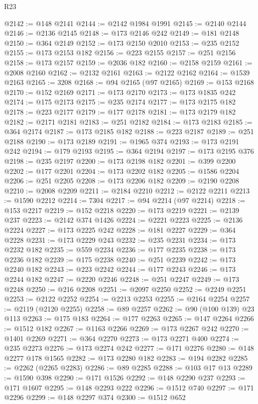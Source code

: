 \begin{lexlean}{R23}
\begin{coremodule}
@2142 := @148 @2141
@2144 := @2142 @1984 @1991
@2145 := @2140 @2144
@2146 := @2136 @2145
@2148 := @173 @2146 @242
@2149 := @181 @2148
@2150 := @364 @2149
@2152 := @173 @2150 @2010
@2153 := @235 @2152
@2155 := @173 @2153 @182
@2156 := @223 @2155
@2157 := @251 @2156
@2158 := @173 @2157
@2159 := @2036 @182
@2160 := @2158 @2159
@2161 := @2008 @2160
@2162 := @2132 @2161
@2163 := @2122 @2162
@2164 := @1539 @2163
@2165 := 3208
@2168 := @94 @2165 (@97 @2165)
@2169 := @153 @2168
@2170 := @152 @2169
@2171 := @173 @2170
@2173 := @173 @1835 @242
@2174 := @175 @2173
@2175 := @235 @2174
@2177 := @173 @2175 @182
@2178 := @223 @2177
@2179 := @177 @2178
@2181 := @173 @2179 @182
@2182 := @2171 @2181
@2183 := @251 @2182
@2184 := @173 @2183
@2185 := @364 @2174
@2187 := @173 @2185 @182
@2188 := @223 @2187
@2189 := @251 @2188
@2190 := @173 @2189
@2191 := @1965 @374
@2193 := @173 @2191 @242
@2194 := @179 @2193
@2195 := @364 @2194
@2197 := @173 @2195 @376
@2198 := @235 @2197
@2200 := @173 @2198 @182
@2201 := @399 @2200
@2202 := @177 @2201
@2204 := @173 @2202 @182
@2205 := @1586 @2204
@2206 := @251 @2205
@2208 := @173 @2206 @182
@2209 := @2190 @2208
@2210 := @2008 @2209
@2211 := @2184 @2210
@2212 := @2122 @2211
@2213 := @1590 @2212
@2214 := 7304
@2217 := @94 @2214 (@97 @2214)
@2218 := @153 @2217
@2219 := @152 @2218
@2220 := @173 @2219
@2221 := @2139 @237
@2223 := @2142 @374 @1426
@2224 := @2221 @2223
@2225 := @2136 @2224
@2227 := @173 @2225 @242
@2228 := @181 @2227
@2229 := @364 @2228
@2231 := @173 @2229 @243
@2232 := @235 @2231
@2234 := @173 @2232 @182
@2235 := @559 @2234
@2236 := @177 @2235
@2238 := @173 @2236 @182
@2239 := @175 @2238
@2240 := @251 @2239
@2242 := @173 @2240 @182
@2243 := @223 @2242
@2244 := @177 @2243
@2246 := @173 @2244 @182
@2247 := @2220 @2246
@2248 := @251 @2247
@2249 := @173 @2248
@2250 := @216 @2208
@2251 := @2097 @2250
@2252 := @2249 @2251
@2253 := @2122 @2252
@2254 := @2213 @2253
@2255 := @2164 @2254
@2257 := @2119 (@2120 @2255)
@2258 := @89 @2257
@2262 := @90 (@100 @139) @23 @113
@2263 := @175 @183
@2264 := @177 @2263
@2265 := @147 @2264
@2266 := @1512 @182
@2267 := @1163 @2266
@2269 := @173 @2267 @242
@2270 := @1401 @2269
@2271 := @364 @2270
@2273 := @173 @2271 @400
@2274 := @235 @2273
@2276 := @173 @2274 @242
@2277 := @171 @2276
@2280 := @148 @2277 @178 @1565
@2282 := @173 @2280 @182
@2283 := @194 @2282
@2285 := @2262 (@2265 @2283)
@2286 := @89 @2285
@2288 := @103 @17 @13
@2289 := @1590 @398
@2290 := @171 @1526
@2292 := @148 @2290 @237
@2293 := @171 @1607
@2295 := @148 @2293 @222
@2296 := @1512 @740
@2297 := @171 @2296
@2299 := @148 @2297 @374
@2300 := @1512 @652

\end{coremodule}
\end{lexlean}
